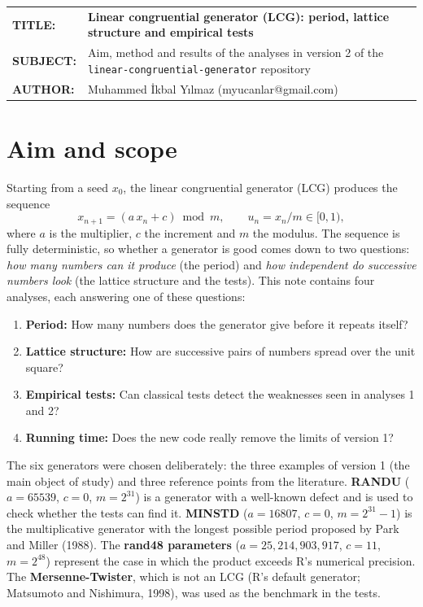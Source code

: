 \documentclass[11pt,a4paper]{article}
\begin{document}
\vspace*{14pt}
\begin{tabular}{@{}p{2.35cm}@{}p{\dimexpr\textwidth-2.35cm}@{}}
\textbf{TITLE:} & \textbf{\large Linear congruential generator (LCG): period, lattice structure and empirical tests}\\[3pt]
\textbf{SUBJECT:} & Aim, method and results of the analyses in version 2 of the \texttt{linear-congruential-generator} repository\\[3pt]
\textbf{AUTHOR:} & Muhammed İkbal Yılmaz (myucanlar@gmail.com)
\end{tabular}

\vspace{8pt}
\vspace{12pt}

\section{Aim and scope}

Starting from a seed $x_0$, the linear congruential generator (LCG) produces the sequence
\[
  x_{n+1} = (a\,x_n + c) \bmod m, \qquad u_n = x_n/m \in [0,1),
\]
where $a$ is the multiplier, $c$ the increment and $m$ the modulus. The sequence is fully deterministic, so whether a
generator is good comes down to two questions: \emph{how many numbers can it produce} (the period) and \emph{how independent
do successive numbers look} (the lattice structure and the tests). This note contains four analyses, each answering one of
these questions:

\begin{enumerate}
  \item \textbf{Period:} How many numbers does the generator give before it repeats itself?
  \item \textbf{Lattice structure:} How are successive pairs of numbers spread over the unit square?
  \item \textbf{Empirical tests:} Can classical tests detect the weaknesses seen in analyses 1 and 2?
  \item \textbf{Running time:} Does the new code really remove the limits of version 1?
\end{enumerate}

The six generators were chosen deliberately: the three examples of version 1 (the main object of study) and three reference
points from the literature. \textbf{RANDU} ($a=65539$, $c=0$, $m=2^{31}$) is a generator with a well-known defect and is used to
check whether the tests can find it. \textbf{MINSTD} ($a=16807$, $c=0$, $m=2^{31}-1$) is the multiplicative generator with the
longest possible period proposed by Park and Miller (1988). The \textbf{rand48 parameters} ($a=25{,}214{,}903{,}917$, $c=11$,
$m=2^{48}$) represent the case in which the product exceeds R's numerical precision. The \textbf{Mersenne-Twister}, which is
not an LCG (R's default generator; Matsumoto and Nishimura, 1998), was used as the benchmark in the tests.
\end{document}
